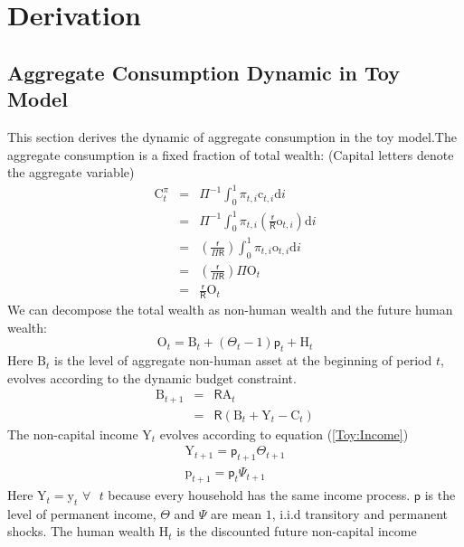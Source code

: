 \documentclass[12pt,letterpaper]{article}
\begin{document}

\clearpage
\appendix
\section{Derivation}
\subsection{Aggregate Consumption Dynamic in Toy Model}
This section derives the dynamic of aggregate consumption in the toy model.The aggregate consumption is a fixed fraction of total wealth: (Capital letters denote the aggregate variable)
\begin{eqnarray}
\mathrm{C}^{\pi}_{t} & = & \Pi^{-1}\int_{0}^{1}\pi_{t,i}\mathrm{c}_{t,i}\text{d}i \nonumber\\
& = & \Pi^{-1}\int_{0}^{1}\pi_{t,i}\left(\frac{\mathsf{r}}{\mathsf{R}}\mathrm{o}_{t,i}\right)\text{d}i \nonumber\\
& = & \left(\frac{\mathsf{r}}{\Pi\mathsf{R}}\right)\int_{0}^{1}\pi_{t,i}\mathrm{o}_{t,i}\text{d}i \nonumber\\
& = & \left(\frac{\mathsf{r}}{\Pi\mathsf{R}}\right)\Pi\mathrm{O}_{t} \nonumber\\
& = & \frac{\mathsf{r}}{\mathsf{R}}\mathrm{O}_{t} \nonumber
\end{eqnarray}
We can decompose the total wealth as non-human wealth and the future human wealth:
\begin{equation}
\mathrm{O}_{t}=\mathrm{B}_{t}+\left(\Theta_{t}-1\right)\mathsf{p}_{t}+\mathrm{H}_{t}
\end{equation}
Here $\mathrm{B}_{t}$ is the level of aggregate non-human asset at the beginning of period $t$, evolves according to the dynamic budget constraint.
\begin{eqnarray}
\mathrm{B}_{t+1} & = & \mathsf{R}\mathrm{A}_{t} \nonumber\\
& = & \mathsf{R}\left(\mathrm{B}_{t}+\mathrm{Y}_{t}-\mathrm{C}_{t}\right)
\end{eqnarray} 
The non-capital income $\mathrm{Y}_{t}$ evolves according to equation (\ref{Toy:Income})
\begin{eqnarray*}
	\mathrm{Y}_{t+1}=\mathsf{p}_{t+1}\Theta_{t+1}\\
	\mathrm{p}_{t+1}=\mathsf{p}_{t}\Psi_{t+1}
\end{eqnarray*}
Here $\mathrm{Y}_{t}=\mathrm{y}_{t}$ $\forall\text{ }t$ because every household has the same income process. $\mathsf{p}$ is the level of permanent income, $\Theta$ and $\Psi$ are mean $1$, i.i.d transitory and permanent shocks.  The human wealth $\mathrm{H}_{t}$ is the discounted future non-capital income
\end{document}
